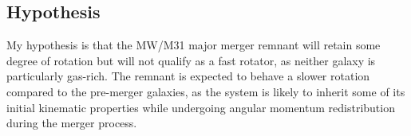 \documentclass[twocolumn, trackchanges]{aastex7}
\begin{document}
\subsection{Hypothesis} 
My hypothesis is that the MW/M31 major merger remnant will retain some degree of rotation but will not qualify as a fast rotator, as neither galaxy is particularly gas-rich. The remnant is expected to behave a slower rotation compared to the pre-merger galaxies, as the system is likely to inherit some of its initial kinematic properties while undergoing angular momentum redistribution during the merger process.



\end{document}
